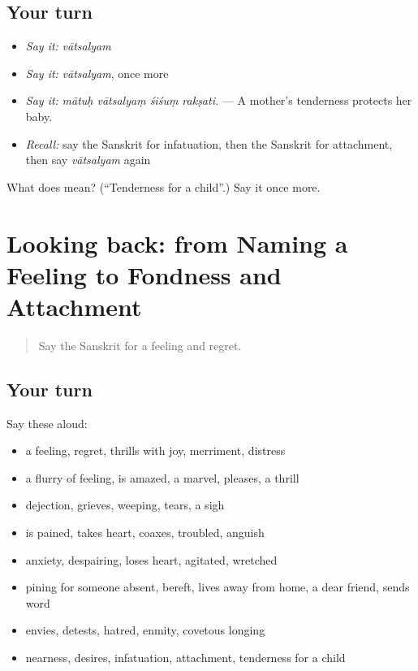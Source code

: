 \subsection*{Your turn}
\begin{itemize}
\raggedright
  \item \emph{Say it:} \emph{vātsalyam}
  \item \emph{Say it:} \emph{vātsalyam}, once more
  \item \emph{Say it:} \emph{mātuḥ vātsalyaṃ śiśuṃ rakṣati.} — A mother's tenderness protects her baby.
  \item \emph{Recall:} say the Sanskrit for infatuation, then the Sanskrit for attachment, then say \emph{vātsalyam} again
\end{itemize}

\begin{tcolorbox}[breakable,colback=teal!4,colframe=teal!35!black,title={Before you move on}]
What does  mean? (\textquotedblleft{}Tenderness for a child\textquotedblright{}.) Say it once more.
\end{tcolorbox}
\section[(dialogue)]{Looking back: from Naming a Feeling to Fondness and Attachment}

\label{lesson:SA-R455-review-448-455}



\begin{quote}
Say the Sanskrit for a feeling and regret.
\end{quote}

\subsection*{Your turn}
Say these aloud:

\begin{itemize}
\raggedright
  \item a feeling, regret, thrills with joy, merriment, distress
  \item a flurry of feeling, is amazed, a marvel, pleases, a thrill
  \item dejection, grieves, weeping, tears, a sigh
  \item is pained, takes heart, coaxes, troubled, anguish
  \item anxiety, despairing, loses heart, agitated, wretched
  \item pining for someone absent, bereft, lives away from home, a dear friend, sends word
  \item envies, detests, hatred, enmity, covetous longing
  \item nearness, desires, infatuation, attachment, tenderness for a child
\end{itemize}

